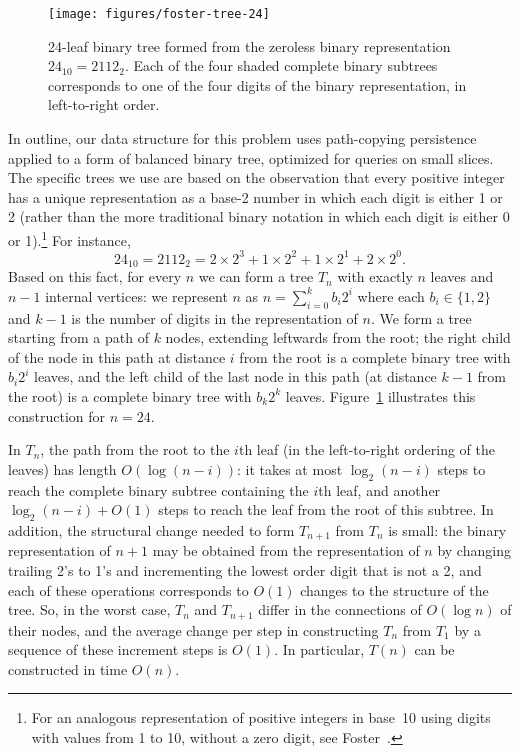 \documentclass[11pt]{article}
\begin{document}
\begin{figure}[t]
\centering\texttt{[image: figures/foster-tree-24]}
\caption{24-leaf binary tree formed from the zeroless binary representation $24_{10}=2112_2$. Each of the four shaded complete binary subtrees corresponds to one of the four digits of the binary representation, in left-to-right order.}
\label{fig:foster-tree-24}
\end{figure}

In outline, our data structure for this problem uses path-copying persistence~\cite{DSPersistent} applied to a form of balanced binary tree, optimized for queries on small slices.
The specific trees we use are based on the observation that every positive integer has a unique representation as a base-2 number in which each digit is either 1 or 2 (rather than the more traditional binary notation in which each digit is either 0 or 1).\footnote{For an analogous representation of positive integers in base~10 using digits with values from 1 to 10, without a zero digit, see Foster~\cite{Fos-MM-47}.} For instance,
$$24_{10}=2112_2=2\times 2^3+1\times 2^2+1\times 2^1+2\times 2^0.$$
Based on this fact, for every $n$ we can form a tree $T_n$ with exactly $n$ leaves and $n-1$ internal vertices: we represent $n$ as $n=\sum_{i=0}^k b_i 2^i$ where each $b_i\in\{1,2\}$ and $k-1$ is the number of digits in the representation of $n$. We form a tree starting from a path of $k$ nodes, extending leftwards from the root; the right child of the node in this path at distance $i$ from the root is a complete binary tree with $b_i2^i$ leaves, and the left child of the last node in this path (at distance $k-1$ from the root) is a complete binary tree with $b_k2^k$ leaves. Figure~\ref{fig:foster-tree-24} illustrates this construction for $n=24$.

In $T_n$, the path from the root to the $i$th leaf (in the left-to-right ordering of the leaves) has length $O(\log(n-i))$: it takes at most $\log_2(n-i)$ steps to reach the complete binary subtree containing the $i$th leaf, and another $\log_2(n-i)+O(1)$ steps to reach the leaf from the root of this subtree. In addition, the structural change needed to form $T_{n+1}$ from $T_n$ is small: the binary representation of $n+1$ may be obtained from the representation of $n$ by changing trailing 2's to 1's and incrementing the lowest order digit that is not a 2, and each of these operations corresponds to $O(1)$ changes to the structure of the tree. So, in the worst case, $T_n$ and $T_{n+1}$ differ in the connections of $O(\log n)$ of their nodes, and the average change per step in constructing $T_n$ from $T_1$ by a sequence of these increment steps is $O(1)$. In particular, $T(n)$ can be constructed in time $O(n)$.
\end{document}
